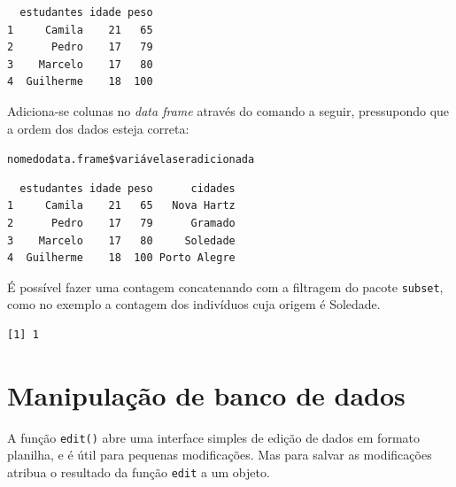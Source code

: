 \documentclass[12pt,portuguese,oneside]{book}
\newenvironment{Shaded}{\begin{snugshade}}{\end{snugshade}}
\newcommand{\KeywordTok}[1]{\textcolor[rgb]{0.13,0.29,0.53}{\textbf{#1}}}
\newcommand{\StringTok}[1]{\textcolor[rgb]{0.31,0.60,0.02}{#1}}
\newcommand{\OperatorTok}[1]{\textcolor[rgb]{0.81,0.36,0.00}{\textbf{#1}}}
\newcommand{\NormalTok}[1]{#1}
\begin{document}
\begin{verbatim}
  estudantes idade peso
1     Camila    21   65
2      Pedro    17   79
3    Marcelo    17   80
4  Guilherme    18  100
\end{verbatim}

Adiciona-se colunas no \emph{data frame} através do comando a seguir,
pressupondo que a ordem dos dados esteja correta:

\texttt{nomedodata.frame\$variávelaseradicionada}

\begin{Shaded}
\end{Shaded}

\begin{verbatim}
  estudantes idade peso      cidades
1     Camila    21   65   Nova Hartz
2      Pedro    17   79      Gramado
3    Marcelo    17   80     Soledade
4  Guilherme    18  100 Porto Alegre
\end{verbatim}

É possível fazer uma contagem concatenando com a filtragem do pacote
\texttt{subset}, como no exemplo a contagem dos indivíduos cuja origem é
Soledade.

\begin{Shaded}
\end{Shaded}

\begin{verbatim}
[1] 1
\end{verbatim}

\section{Manipulação de banco de
dados}\label{manipulacao-de-banco-de-dados}

A função \texttt{edit()} abre uma interface simples de edição de dados
em formato planilha, e é útil para pequenas modificações. Mas para
salvar as modificações atribua o resultado da função \texttt{edit} a um
objeto.
\end{document}
